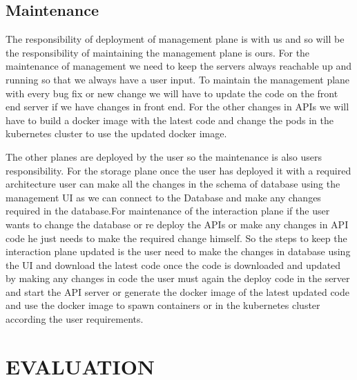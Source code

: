 \documentclass[letterpaper, 10 pt, conference]{ieeeconf}
\begin{document}
\subsection{Maintenance}
The responsibility of deployment of management plane is with us and so will be the responsibility of maintaining the management plane is ours. For the maintenance of management we need to keep the servers always reachable up and running so that we always have a user input. To maintain the management plane with every bug fix or new change we will have to  update the code on the front end server if we have changes in front end. For the other changes in APIs we will have to build a docker image with the latest code and change the pods in the kubernetes cluster to use the updated docker image.

The other planes are deployed by the user so the maintenance is also users responsibility. For the storage plane once the user has deployed it with a required architecture user can make all the changes in the schema of database using the management UI as we can connect to the Database and make any changes required in the database.For maintenance of the interaction plane if the user wants to change the database or re deploy the APIs or make any changes in API code he just needs to make the required change himself. So the steps to keep the interaction plane updated is the user need to make the changes in database using the UI and download the latest code once the code is downloaded and updated by making any changes in code the user must again the deploy code in the server and start the API server or generate the docker image of the latest updated code and use the docker image to spawn containers or in the kubernetes cluster according the user requirements.

\section{EVALUATION}
\end{document}
